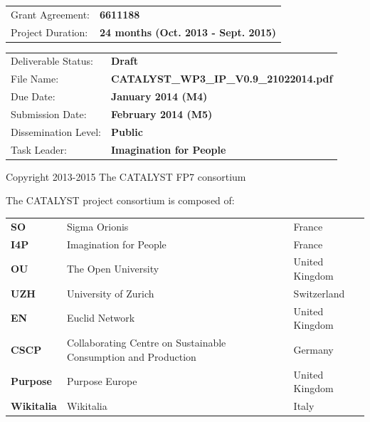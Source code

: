 {\begin{tabular}{l>{\bfseries}l}
  Grant Agreement: & 6611188 \\
  Project Duration: & 24 months (Oct. 2013 - Sept. 2015) \\
  \end{tabular}
  \vspace{1.5cm}
  \begin{mdframed}[backgroundcolor=orange, fontcolor=white, defaultunit=pt, linewidth=0, innerleftmargin=4, innerrightmargin=4, innertopmargin=10, innerbottommargin=10,skipabove=8,skipbelow=4]
  \begin{center}
  \bfseries\large\docnumber  \mytitle\mdseries\normalsize
  \end{center}
  \end{mdframed}

  \par

  \begin{tabular}{l>{\bfseries}l}
Deliverable Status: & Draft \\
File Name: & CATALYST\_WP3\_IP\_V0.9\_21022014.pdf \\
Due Date: & January 2014 (M4) \\
Submission Date: & February 2014 (M5) \\
Dissemination Level: & Public \\
Task Leader: & Imagination for People \\
  \end{tabular}
  \par
  \vspace{2cm}
  \footnotesize \textcopyright Copyright 2013-2015 The CATALYST FP7 consortium\par \normalsize
}
\makeatother


\def\format{complete}

\frontmatter
{}

\maketitle
\mainmatter
\pagestyle{catalystp}

\clearpage

\footnotesize
The CATALYST project consortium is composed of:

\begin{tabular}{>{\bfseries}lll}
SO & Sigma Orionis & France \\
I4P & Imagination for People & France \\
OU & The Open University & United Kingdom \\
UZH & University of Zurich & Switzerland \\
EN & Euclid Network & United Kingdom \\
CSCP & Collaborating Centre on Sustainable Consumption and Production & Germany \\
Purpose & Purpose Europe & United Kingdom \\
Wikitalia & Wikitalia & Italy \\
\end{tabular}
\par
\vspace{12cm}

